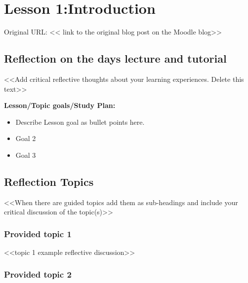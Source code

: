 

\section{Lesson 1:Introduction} %

Original URL: << link to the original blog post on the Moodle blog>> %

\subsection{Reflection on the days lecture and tutorial}

<<Add critical reflective thoughts about your learning experiences. Delete this text>>

{\bfseries{Lesson/Topic goals/Study Plan:}}
\begin{itemize}
    \item Describe Lesson goal as bullet points here.
    \item Goal 2
    \item Goal 3
\end{itemize}


\blindtext[3] %

\subsection{Reflection Topics}

<<When there are guided topics add them as sub-headings and include your critical discussion of the topic(s)>>

\blindtext[3]  %

\subsubsection{Provided topic 1}

<<topic 1 example reflective discussion>>

\blindtext[3] %

\subsubsection{Provided topic 2}

